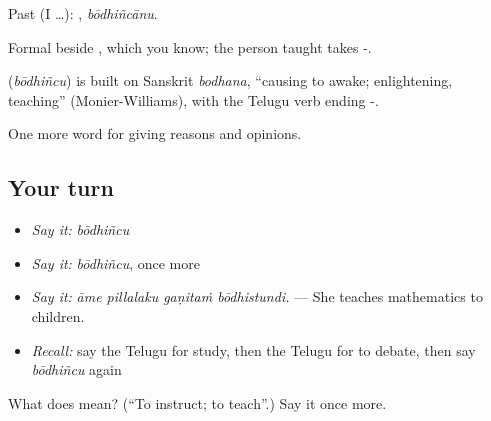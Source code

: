 Past (I …): , \emph{bōdhiñcānu}.

Formal beside , which you know; the person taught takes -.

\begin{cousinweb}
\textbf{} (\emph{bōdhiñcu}) is built on Sanskrit \emph{bodhana}, \textquotedblleft{}causing to awake; enlightening, teaching\textquotedblright{} (Monier-Williams), with the Telugu verb ending -.
\end{cousinweb}

\begin{grammarlens}[title={What you've built}]
One more word for giving reasons and opinions.
\end{grammarlens}

\subsection*{Your turn}
\begin{itemize}
\raggedright
  \item \emph{Say it:} \emph{bōdhiñcu}
  \item \emph{Say it:} \emph{bōdhiñcu}, once more
  \item \emph{Say it:} \emph{āme pillalaku gaṇitaṁ bōdhistundi.} — She teaches mathematics to children.
  \item \emph{Recall:} say the Telugu for study, then the Telugu for to debate, then say \emph{bōdhiñcu} again
\end{itemize}

\begin{tcolorbox}[breakable,colback=teal!4,colframe=teal!35!black,title={Before you move on}]
What does  mean? (\textquotedblleft{}To instruct; to teach\textquotedblright{}.) Say it once more.
\end{tcolorbox}
